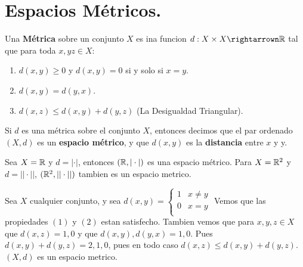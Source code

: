 
\section{Espacios M\'etricos.}

\begin{definition}
    Una \textbf{M\'etrica} sobre un conjunto $X$ es ina funcion  $d:X \times X \rightarrown \R$ tal
    que para toda $x,yz \in X$:
        \begin{enumerate}[label=(\arabic*)]
            \item $d(x,y) \geq 0$ y $d(x,y)=0$ si y solo si $x=y$.

            \item $d(x,y)=d(y,x)$.

            \item $d(x,z) \leq d(x,y)+d(y,z)$ (La Desigualdad Triangular).
        \end{enumerate}
        Si $d$ es una m\'etrica sobre el conjunto $X$, entonces decimos que el par ordenado  $(X,d)$
        es un \textbf{espacio m\'etrico}, y que $ d(x,y)$ es la \textbf{distancia} entre $x$ y y.
\end{definition}

\begin{example}
    Sea $X=\mathbb{R}$ y  $d=|\cdot|$, entonces $(\mathbb{R},|\cdot|)$ es una espacio m\'etrico. Para $X=\mathbb{R}^2$ y
    $d=||\cdot||$,  $(\mathbb{R}^2,||\cdot||)$ tambien es un espacio metrico.		
\end{example} 

\begin{example}
    Sea $X$ cualquier conjunto, y sea  $d(x,y)=\begin{cases} 1 & x \neq y \\ 0 & x=y \\\end{cases}$ 
    Vemos que las propiedades $(1)$ y $(2)$ estan satisfecho. Tambien vemos que para $x,y,z \in X$
    que  $d(x,z)=1,0$ y que $d(x,y),d(y,x)=1,0$. Pues $d(x,y)+d(y,z)=2,1,0$, pues en todo caso
    $d(x,z) \leq d(x,y)+d(y,z)$. $(X,d)$ es un espacio metrico.
\end{example} 
